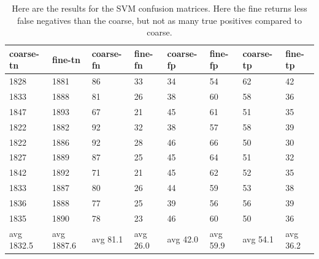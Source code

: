 \documentclass[ms]{nuthesis}
\begin{document}
\FloatBarrier
\begin{table}[h]
  \centering
  \begin{tabular}{|l||l||l||l||l||l||l||l|}\toprule
    coarse-tn & fine-tn & coarse-fn & fine-fn & coarse-fp & fine-fp & coarse-tp & fine-tp \\ \midrule
    1828 & 1881 & 86 & 33 & 34 & 54 & 62 & 42 \\
    1833 & 1888 & 81 & 26 & 38 & 60 & 58 & 36 \\
    1847 & 1893 & 67 & 21 & 45 & 61 & 51 & 35 \\
    1822 & 1882 & 92 & 32 & 38 & 57 & 58 & 39 \\
    1822 & 1886 & 92 & 28 & 46 & 66 & 50 & 30 \\
    1827 & 1889 & 87 & 25 & 45 & 64 & 51 & 32 \\
    1842 & 1892 & 71 & 21 & 45 & 62 & 52 & 35 \\
    1833 & 1887 & 80 & 26 & 44 & 59 & 53 & 38 \\
    1836 & 1888 & 77 & 25 & 39 & 56 & 56 & 39 \\
    1835 & 1890 & 78 & 23 & 46 & 60 & 50 & 36 \\
    avg 1832.5 & avg 1887.6 & avg 81.1 & avg 26.0 & avg 42.0 & avg 59.9 & avg 54.1 & avg 36.2 \\ \bottomrule
  \end{tabular}
  \caption{Here are the results for the SVM confusion matrices. Here the fine returns less false negatives
  than the coarse, but not as many true positives compared to coarse.}
  \label{tab:SVM}
\end{table}
\FloatBarrier
\end{document}
